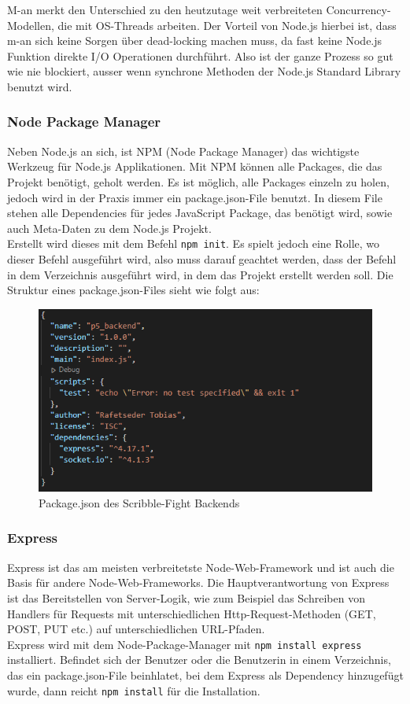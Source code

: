 M-an merkt den Unterschied zu den heutzutage weit verbreiteten Concurrency-Modellen, die mit OS-Threads arbeiten. Der Vorteil von Node.js hierbei ist, dass
m-an sich keine Sorgen über dead-locking machen muss, da fast keine Node.js Funktion direkte I/O Operationen durchführt. Also ist der ganze Prozess so gut wie nie blockiert, ausser
wenn synchrone Methoden der Node.js Standard Library benutzt wird.

\subsubsection{Node Package Manager}\label{NPM}
Neben Node.js an sich, ist NPM (Node Package Manager) das wichtigste Werkzeug für Node.js Applikationen. Mit NPM können alle Packages, die das Projekt benötigt, geholt werden.
Es ist möglich, alle Packages einzeln zu holen, jedoch wird in der Praxis immer ein package.json-File benutzt. In diesem File stehen alle Dependencies für jedes JavaScript Package,
das benötigt wird, sowie auch Meta-Daten zu dem Node.js Projekt. \cite{node_environment}  \\
Erstellt wird dieses mit dem Befehl \texttt{npm init}. Es spielt jedoch eine Rolle, wo dieser Befehl ausgeführt wird, also muss darauf geachtet werden, dass der Befehl in dem Verzeichnis ausgeführt wird, in dem das Projekt erstellt werden soll.
Die Struktur eines package.json-Files sieht wie folgt aus:
\begin{figure}[H]
  \centering
  \includegraphics[scale=1]{pics/package json.PNG}
  \caption{Package.json des Scribble-Fight Backends}
\end{figure}

\subsubsection{Express}
Express ist das am meisten verbreitetste Node-Web-Framework und ist auch die Basis für andere Node-Web-Frameworks. Die Hauptverantwortung
von Express ist das Bereitstellen von Server-Logik, wie zum Beispiel das Schreiben von Handlers für Requests mit unterschiedlichen Http-Request-Methoden (GET, POST, PUT etc.) auf unterschiedlichen URL-Pfaden. \cite{node_environment} \\
Express wird mit dem Node-Package-Manager mit \texttt{npm install express} installiert. Befindet sich der Benutzer oder die Benutzerin in
einem Verzeichnis, das ein package.json-File beinhlatet, bei dem Express als Dependency hinzugefügt wurde, dann reicht \texttt{npm install} für die Installation.

